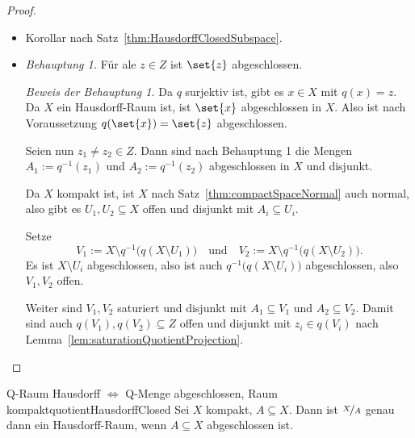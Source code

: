 \documentclass[language=ngerman]{TemplateLecture} %
\begin{document}

\begin{proof}
    \begin{itemize}
        \item[\enquote{$\Rightarrow$}:] Korollar nach Satz~\ref{thm:HausdorffClosedSubspace}.
        \item[\enquote{$\Leftarrow$}:] \emph{Behauptung 1.} Für ale $z \in Z$ ist $\set{z}$ abgeschlossen.

        \emph{Beweis der Behauptung 1.} Da $q$ surjektiv ist, gibt es $x \in X$ mit $q(x) = z$. Da $X$ ein Hausdorff-Raum ist, ist $\set{x}$ abgeschlossen in $X$. Also ist nach Voraussetzung $q(\set{x}) = \set{z}$ abgeschlossen.

        Seien nun $z_1 \neq z_2 \in Z$. Dann sind nach Behauptung 1 die Mengen $A_1 := q^{-1}(z_1)$ und $A_2 := q^{-1}(z_2)$ abgeschlossen in $X$ und disjunkt.

        Da $X$ kompakt ist, ist $X$ nach Satz~\ref{thm:compactSpaceNormal} auch normal, also gibt es $U_1, U_2 \subseteq X$ offen und disjunkt mit $A_i \subseteq U_i$.

        Setze
        \begin{equation*}
            V_1 := X \setminus q^{-1}\big(q(X \setminus U_1)\big) \quad \text{und} \quad V_2 := X \setminus q^{-1}\big(q(X \setminus U_2)\big).
        \end{equation*}
        Es ist $X \setminus U_i$ abgeschlossen, also ist auch $q^{-1}\bigl(q(X \setminus U_i)\bigr)$ abgeschlossen, also $V_1, V_2$ offen.

        Weiter sind $V_1, V_2$ saturiert und disjunkt mit $A_1 \subseteq V_1$ und $A_2 \subseteq V_2$. Damit sind auch $q(V_1), q(V_2) \subseteq Z$ offen und disjunkt mit $z_i \in q(V_i)$ nach Lemma~\ref{lem:saturationQuotientProjection}.
    \end{itemize}
\end{proof}

\begin{thm}{Q-Raum Hausdorff $\Leftrightarrow$ Q-Menge abgeschlossen, Raum kompakt}{quotientHausdorffClosed}
    Sei $X$ kompakt, $A \subseteq X$. Dann ist $\nicefrac{X}{A}$ genau dann ein Hausdorff-Raum, wenn $A \subseteq X$ abgeschlossen ist.
\end{thm}
\end{document}
